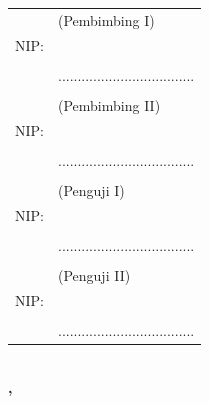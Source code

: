 \noindent
\begin{tabularx}{\textwidth}{X l}
  \advisor{}               & (Pembimbing I)              \\
  NIP: \advisornip{}       &                             \\
                            &  \\
                            & ................................... \\
                            &                             \\
  \coadvisor{}             & (Pembimbing II)             \\
  NIP: \coadvisornip{}     &                             \\
                            &  \\
                            & ................................... \\
                            &                             \\
  \examinerone{}           & (Penguji I)                 \\
  NIP: \examineronenip{}   &                             \\
                            &  \\
                            & ................................... \\
                            &                             \\
  \examinertwo{}           & (Penguji II)                \\
  NIP: \examinertwonip{}   &                             \\
                            &  \\
                            & ................................... \\
\end{tabularx}
\endgroup

\begin{center}
  \textbf{\MakeUppercase{\place{}}\\\MONTH{}, \the\year{}}
\end{center}
\endgroup
